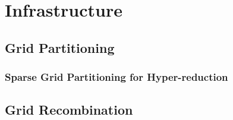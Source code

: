 \section{Infrastructure}

\subsection{Grid Partitioning}

\subsubsection{Sparse Grid Partitioning for Hyper-reduction}

\subsection{Grid Recombination}
